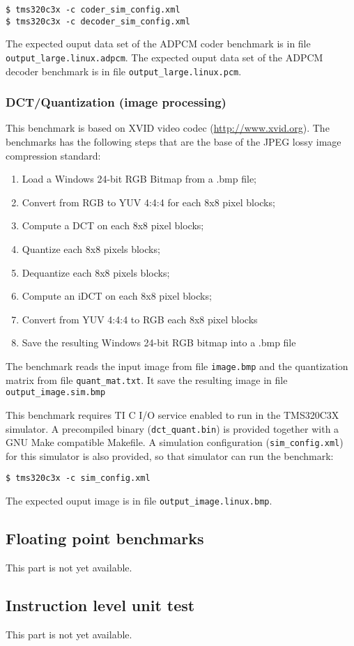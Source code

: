 \begin{verbatim}
$ tms320c3x -c coder_sim_config.xml
$ tms320c3x -c decoder_sim_config.xml
\end{verbatim}

The expected ouput data set of the ADPCM coder benchmark is in file \texttt{output\_large.linux.adpcm}.
The expected ouput data set of the ADPCM decoder benchmark is in file \texttt{output\_large.linux.pcm}.

\subsubsection{DCT/Quantization (image processing)}

This benchmark is based on XVID video codec (\url{http://www.xvid.org}).
The benchmarks has the following steps that are the base of the JPEG lossy image compression standard:
\begin{enumerate}
\item Load a Windows 24-bit RGB Bitmap from a .bmp file;
\item Convert from RGB to YUV 4:4:4 for each 8x8 pixel blocks;
\item Compute a DCT on each 8x8 pixel blocks;
\item Quantize each 8x8 pixels blocks;
\item Dequantize each 8x8 pixels blocks;
\item Compute an iDCT on each 8x8 pixel blocks;
\item Convert from YUV 4:4:4 to RGB each 8x8 pixel blocks
\item Save the resulting Windows 24-bit RGB bitmap into a .bmp file
\end{enumerate}

The benchmark reads the input image from file \texttt{image.bmp} and the quantization matrix from file \texttt{quant\_mat.txt}.
It save the resulting image in file \texttt{output\_image.sim.bmp}

This benchmark requires TI C I/O service enabled to run in the TMS320C3X simulator.
A precompiled binary (\texttt{dct\_quant.bin}) is provided together with a GNU Make compatible Makefile.
A simulation configuration (\texttt{sim\_config.xml}) for this simulator is also provided, so that simulator can run the benchmark:

\begin{verbatim}
$ tms320c3x -c sim_config.xml
\end{verbatim}

The expected ouput image is in file \texttt{output\_image.linux.bmp}.

\subsection{Floating point benchmarks}

This part is not yet available.

\subsection{Instruction level unit test}

This part is not yet available.
